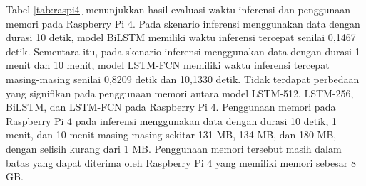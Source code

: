 Tabel \ref{tab:raspi4} menunjukkan hasil evaluasi waktu inferensi dan penggunaan memori pada Raspberry Pi 4.
Pada skenario inferensi menggunakan data dengan durasi 10 detik, model BiLSTM memiliki waktu inferensi tercepat senilai 0,1467 detik.
Sementara itu, pada skenario inferensi menggunakan data dengan durasi 1 menit dan 10 menit, model LSTM-FCN memiliki waktu inferensi tercepat masing-masing senilai 0,8209 detik dan 10,1330 detik.
Tidak terdapat perbedaan yang signifikan pada penggunaan memori antara model LSTM-512, LSTM-256, BiLSTM, dan LSTM-FCN pada Raspberry Pi 4.
Penggunaan memori pada Raspberry Pi 4 pada inferensi menggunakan data dengan durasi 10 detik, 1 menit, dan 10 menit masing-masing sekitar 131 MB, 134 MB, dan 180 MB, dengan selisih kurang dari 1 MB.
Penggunaan memori tersebut masih dalam batas yang dapat diterima oleh Raspberry Pi 4 yang memiliki memori sebesar 8 GB.


